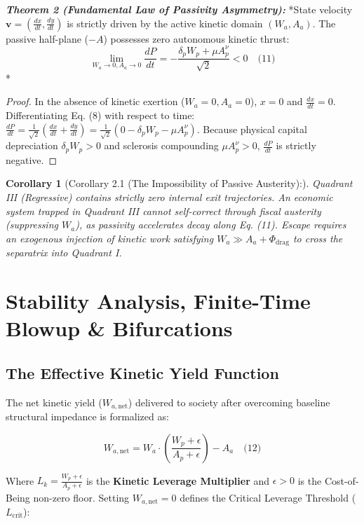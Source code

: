 \documentclass[preprint,12pt,authoryear]{elsarticle}
\newtheorem{corollary}{Corollary}
\theoremstyle{definition}
\begin{document}
\textbf{\textit{Theorem 2 (Fundamental Law of Passivity Asymmetry):}} *State velocity $\mathbf{v} = \left( \frac{dx}{dt}, \frac{dy}{dt} \right)$ is strictly driven by the active kinetic domain $(W_a, A_a)$. The passive half-plane ($-A$) possesses zero autonomous kinetic thrust: $$\lim_{W_a \to 0, A_a \to 0} \frac{dP}{dt} = - \frac{\delta_p W_p + \mu A_p^\nu}{\sqrt{2}} < 0 \quad \text{(11)}$$*

\begin{proof} In the absence of kinetic exertion ($W_a = 0, A_a = 0$), $x = 0$ and $ \frac{dx}{dt} = 0$. Differentiating Eq. (8) with respect to time: $ \frac{dP}{dt} = \frac{1}{\sqrt{2}}\left( \frac{dx}{dt} + \frac{dy}{dt} \right) = \frac{1}{\sqrt{2}}\left(0 - \delta_p W_p - \mu A_p^\nu \right)$. Because physical capital depreciation $\delta_p W_p > 0$ and sclerosis compounding $\mu A_p^\nu > 0$, $ \frac{dP}{dt}$ is strictly negative. \end{proof}

\begin{corollary}[Corollary 2.1 (The Impossibility of Passive Austerity):] Quadrant III (Regressive) contains strictly zero internal exit trajectories. An economic system trapped in Quadrant III cannot self-correct through fiscal austerity (suppressing $W_a$), as passivity accelerates decay along Eq. (11). Escape requires an exogenous injection of kinetic work satisfying $W_a \gg A_a + \Phi_{ \text{drag}}$ to cross the separatrix into Quadrant I.
\end{corollary}

\section{Stability Analysis, Finite-Time Blowup \& Bifurcations}

\subsection{The Effective Kinetic Yield Function}

The net kinetic yield ($W_{a, \text{net}}$) delivered to society after overcoming baseline structural impedance is formalized as:

$$W_{a, \text{net}} = W_a \cdot \left( \frac{W_p + \epsilon}{A_p + \epsilon} \right) - A_a \quad \text{(12)}$$

Where $L_k = \frac{W_p + \epsilon}{A_p + \epsilon}$ is the \textbf{Kinetic Leverage Multiplier} and $\epsilon > 0$ is the Cost-of-Being non-zero floor. Setting $W_{a, \text{net}} = 0$ defines the Critical Leverage Threshold ($L_{ \text{crit}}$):
\end{document}
